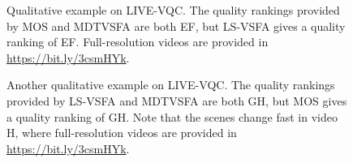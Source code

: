 \documentclass[twocolumn]{svjour3}          \smartqed  \usepackage{graphicx}
\begin{document}
\begin{figure}[!htb]
\begin{center}
\hfill  
\hfill
\end{center}
  \caption{Qualitative example on LIVE-VQC. The quality rankings provided by MOS and MDTVSFA are both EF, but LS-VSFA gives a quality ranking of EF. Full-resolution videos are provided in \url{https://bit.ly/3csmHYk}.} 
 \label{fig:examples2}
\end{figure}

\begin{figure}[!htb]
\begin{center} 
\hfill  
\hfill
\end{center}
  \caption{Another qualitative example on LIVE-VQC. The quality rankings provided by LS-VSFA and MDTVSFA are both GH, but MOS gives a quality ranking of GH. Note that the scenes change fast in video H, where full-resolution videos are provided in \url{https://bit.ly/3csmHYk}.} 
 \label{fig:examples3}
\end{figure}
\end{document}
